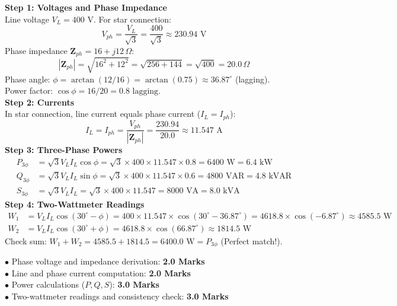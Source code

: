 \begin{solutionbox}
\textbf{Step 1: Voltages and Phase Impedance}\\
Line voltage $V_L = 400\text{ V}$. For star connection:
\[ V_{ph} = \frac{V_L}{\sqrt{3}} = \frac{400}{\sqrt{3}} \approx 230.94\text{ V} \]
Phase impedance $\mathbf{Z}_{ph} = 16 + j12\,\Omega$:
\[ |\mathbf{Z}_{ph}| = \sqrt{16^2 + 12^2} = \sqrt{256 + 144} = \sqrt{400} = 20.0\,\Omega \]
Phase angle: $\phi = \arctan(12/16) = \arctan(0.75) \approx 36.87^\circ$ (lagging).\\
Power factor: $\cos\phi = 16 / 20 = 0.8\text{ lagging}$.\\
\textbf{Step 2: Currents}\\
In star connection, line current equals phase current ($I_L = I_{ph}$):
\[ I_L = I_{ph} = \frac{V_{ph}}{|\mathbf{Z}_{ph}|} = \frac{230.94}{20.0} \approx 11.547\text{ A} \]
\textbf{Step 3: Three-Phase Powers}\\
\begin{align*}
P_{3\phi} &= \sqrt{3} V_L I_L \cos\phi = \sqrt{3} \times 400 \times 11.547 \times 0.8 = 6400\text{ W} = 6.4\text{ kW} \\
Q_{3\phi} &= \sqrt{3} V_L I_L \sin\phi = \sqrt{3} \times 400 \times 11.547 \times 0.6 = 4800\text{ VAR} = 4.8\text{ kVAR} \\
S_{3\phi} &= \sqrt{3} V_L I_L = \sqrt{3} \times 400 \times 11.547 = 8000\text{ VA} = 8.0\text{ kVA}
\end{align*}
\textbf{Step 4: Two-Wattmeter Readings}\\
\begin{align*}
W_1 &= V_L I_L \cos(30^\circ - \phi) = 400 \times 11.547 \times \cos(30^\circ - 36.87^\circ) = 4618.8 \times \cos(-6.87^\circ) \approx 4585.5\text{ W} \\
W_2 &= V_L I_L \cos(30^\circ + \phi) = 4618.8 \times \cos(66.87^\circ) \approx 1814.5\text{ W}
\end{align*}
Check sum: $W_1 + W_2 = 4585.5 + 1814.5 = 6400.0\text{ W} = P_{3\phi}$ (Perfect match!).
\begin{markingrubric}
$\bullet$ Phase voltage and impedance derivation: \textbf{2.0 Marks}\\
$\bullet$ Line and phase current computation: \textbf{2.0 Marks}\\
$\bullet$ Power calculations ($P, Q, S$): \textbf{3.0 Marks}\\
$\bullet$ Two-wattmeter readings and consistency check: \textbf{3.0 Marks}
\end{markingrubric}
\end{solutionbox}
\newpage
